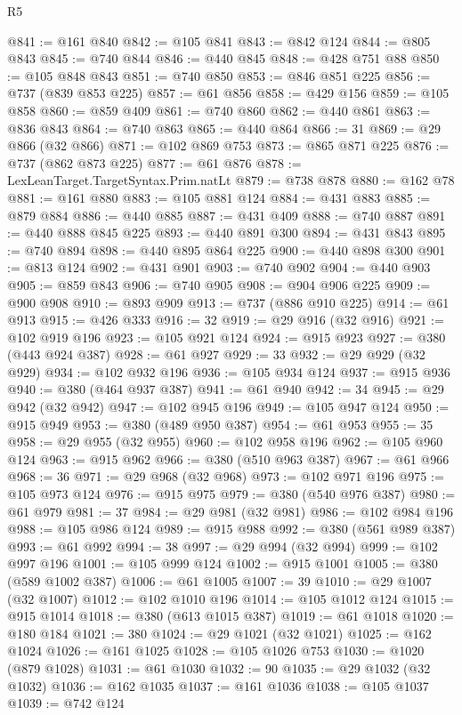 \begin{lexlean}{R5}
\begin{coremodule}
{{{{{{{{{{{{{{{{{{{{{{{{{{{{{{{{{{{{{{{{{{{{{{{{{{{{{{{{{{{{{{{{{{{{{{{{{{{{{{{{{{{{@841 := @161 @840
@842 := @105 @841
@843 := @842 @124
@844 := @805 @843
@845 := @740 @844
@846 := @440 @845
@848 := @428 @751 @88
@850 := @105 @848 @843
@851 := @740 @850
@853 := @846 @851 @225
@856 := @737 (@839 @853 @225)
@857 := @61 @856
@858 := @429 @156
@859 := @105 @858
@860 := @859 @409
@861 := @740 @860
@862 := @440 @861
@863 := @836 @843
@864 := @740 @863
@865 := @440 @864
@866 := 31
@869 := @29 @866 (@32 @866)
@871 := @102 @869 @753
@873 := @865 @871 @225
@876 := @737 (@862 @873 @225)
@877 := @61 @876
@878 := LexLeanTarget.TargetSyntax.Prim.natLt
@879 := @738 @878
@880 := @162 @78
@881 := @161 @880
@883 := @105 @881 @124
@884 := @431 @883
@885 := @879 @884
@886 := @440 @885
@887 := @431 @409
@888 := @740 @887
@891 := @440 @888 @845 @225
@893 := @440 @891 @300
@894 := @431 @843
@895 := @740 @894
@898 := @440 @895 @864 @225
@900 := @440 @898 @300
@901 := @813 @124
@902 := @431 @901
@903 := @740 @902
@904 := @440 @903
@905 := @859 @843
@906 := @740 @905
@908 := @904 @906 @225
@909 := @900 @908
@910 := @893 @909
@913 := @737 (@886 @910 @225)
@914 := @61 @913
@915 := @426 @333
@916 := 32
@919 := @29 @916 (@32 @916)
@921 := @102 @919 @196
@923 := @105 @921 @124
@924 := @915 @923
@927 := @380 (@443 @924 @387)
@928 := @61 @927
@929 := 33
@932 := @29 @929 (@32 @929)
@934 := @102 @932 @196
@936 := @105 @934 @124
@937 := @915 @936
@940 := @380 (@464 @937 @387)
@941 := @61 @940
@942 := 34
@945 := @29 @942 (@32 @942)
@947 := @102 @945 @196
@949 := @105 @947 @124
@950 := @915 @949
@953 := @380 (@489 @950 @387)
@954 := @61 @953
@955 := 35
@958 := @29 @955 (@32 @955)
@960 := @102 @958 @196
@962 := @105 @960 @124
@963 := @915 @962
@966 := @380 (@510 @963 @387)
@967 := @61 @966
@968 := 36
@971 := @29 @968 (@32 @968)
@973 := @102 @971 @196
@975 := @105 @973 @124
@976 := @915 @975
@979 := @380 (@540 @976 @387)
@980 := @61 @979
@981 := 37
@984 := @29 @981 (@32 @981)
@986 := @102 @984 @196
@988 := @105 @986 @124
@989 := @915 @988
@992 := @380 (@561 @989 @387)
@993 := @61 @992
@994 := 38
@997 := @29 @994 (@32 @994)
@999 := @102 @997 @196
@1001 := @105 @999 @124
@1002 := @915 @1001
@1005 := @380 (@589 @1002 @387)
@1006 := @61 @1005
@1007 := 39
@1010 := @29 @1007 (@32 @1007)
@1012 := @102 @1010 @196
@1014 := @105 @1012 @124
@1015 := @915 @1014
@1018 := @380 (@613 @1015 @387)
@1019 := @61 @1018
@1020 := @180 @184
@1021 := 380
@1024 := @29 @1021 (@32 @1021)
@1025 := @162 @1024
@1026 := @161 @1025
@1028 := @105 @1026 @753
@1030 := @1020 (@879 @1028)
@1031 := @61 @1030
@1032 := 90
@1035 := @29 @1032 (@32 @1032)
@1036 := @162 @1035
@1037 := @161 @1036
@1038 := @105 @1037
@1039 := @742 @124
}}}}}}}}}}}}}}}}}}}}}}}}}}}}}}}}}}}}}}}}}}}}}}}}}}}}}}}}}}}}}}}}}}}}}}}}}}}}}}}}}}}}
\end{coremodule}
\end{lexlean}
